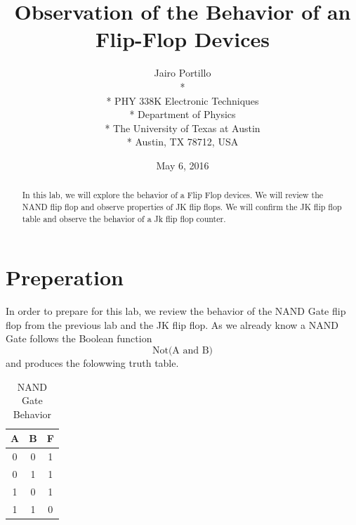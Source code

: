 \documentclass[11pt,letterpaper,onecolumn]{article}
\begin{document}

\title{\bf Observation of the Behavior of an Flip-Flop Devices}

\author{
 Jairo Portillo \\*
  \\*
 PHY 338K Electronic Techniques \\* 
 Department of Physics \\*
 The University of Texas at Austin \\*
 Austin, TX 78712, USA
}
\date{May 6, 2016}


\maketitle


\begin{abstract}

In this lab, we will explore the behavior of a Flip Flop devices. We will review the NAND flip flop and observe properties of JK flip flops. We will confirm the JK flip flop table and observe the behavior of a Jk flip flop counter. 
\end{abstract}



\section{Preperation}

 In order to prepare for this lab, we review the behavior of the NAND Gate flip flop from the previous lab and the JK flip flop. As we already know a NAND Gate follows the Boolean function
$$\text{Not(A and B)}$$
and produces the folowwing truth table. 
 \begin{table}[H]
\centering
\begin{tabular}{|c|c|c|}
 \hline
 A & B & F \\\hline
 0 & 0 & 1 \\
 0 & 1 & 1 \\
 1 & 0 & 1 \\
 1 & 1 & 0 \\
  \hline
\end{tabular}
\caption{NAND Gate Behavior}
\label{tab:NAND}
\end{table}
 
\end{document}
